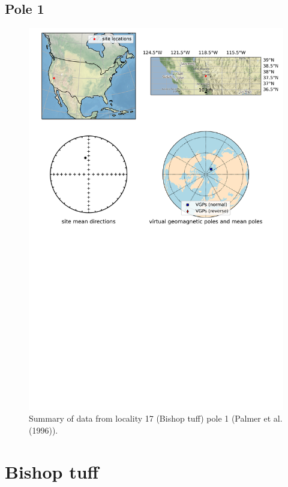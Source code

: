 \subsection{Pole 1}


\begin{figure}[H]
\centering
\includegraphics[width=5 in]{./17/1/pole_summary.png}
\caption{Summary of data from locality 17 (Bishop tuff) pole 1 (Palmer et al. (1996)).}
\end{figure}

\section{Bishop tuff}
